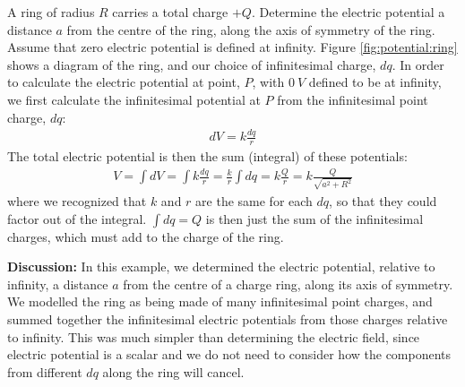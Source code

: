 \begin{example}{\label{ex:potential:ring}A ring of radius $R$ carries a total charge $+Q$. Determine the electric potential a distance $a$ from the centre of the ring, along the axis of symmetry of the ring. Assume that zero electric potential is defined at infinity.}
Figure \ref{fig:potential:ring} shows a diagram of the ring, and our choice of infinitesimal charge, $dq$. 
In order to calculate the electric potential at point, $P$, with $\SI{0}{V}$ defined to be at infinity, we first calculate the infinitesimal potential at $P$ from the infinitesimal point charge, $dq$:
\begin{align*}
dV=k\frac{dq}{r}
\end{align*}
The total electric potential is then the sum (integral) of these potentials:
\begin{align*}
V=\int dV=\int k\frac{dq}{r} = \frac{k}{r}\int dq=k\frac{Q}{r}=k\frac{Q}{\sqrt{a^2+R^2}}
\end{align*}
where we recognized that $k$ and $r$ are the same for each $dq$, so that they could factor out of the integral. $\int dq=Q$ is then just the sum of the infinitesimal charges, which must add to the charge of the ring.

\textbf{Discussion:} In this example, we determined the electric potential, relative to infinity, a distance $a$ from the centre of a charge ring, along its axis of symmetry. We modelled the ring as being made of many infinitesimal point charges, and summed together the infinitesimal electric potentials from those charges relative to infinity. This was much simpler than determining the electric field, since electric potential is a scalar and we do not need to consider how the components from different $dq$ along the ring will cancel.
\end{example}

